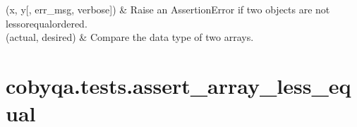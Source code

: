 \documentclass[letterpaper,10pt,english]{sphinxmanual}
\begin{document}
\begin{savenotes}\sphinxatlongtablestart\begin{longtable}[c]{}
\hline

\endfirsthead

%
{}\\
\hline

\endhead

\hline
{}\\
\endfoot

\endlastfoot

\sphinxAtStartPar
{\hyperref[\detokenize{refs/generated/cobyqa.tests.assert_array_less_equal:cobyqa.tests.assert_array_less_equal}]{}}(x, y{[}, err\_msg, verbose{]})
&
\sphinxAtStartPar
Raise an AssertionError if two objects are not less\sphinxhyphen{}or\sphinxhyphen{}equal\sphinxhyphen{}ordered.
\\
\hline
\sphinxAtStartPar
{\hyperref[\detokenize{refs/generated/cobyqa.tests.assert_dtype_equal:cobyqa.tests.assert_dtype_equal}]{}}(actual, desired)
&
\sphinxAtStartPar
Compare the data type of two arrays.
\\
\hline
\end{longtable}\sphinxatlongtableend\end{savenotes}


\section{cobyqa.tests.assert\_array\_less\_equal}
\label{\detokenize{refs/generated/cobyqa.tests.assert_array_less_equal:cobyqa-tests-assert-array-less-equal}}\label{\detokenize{refs/generated/cobyqa.tests.assert_array_less_equal::doc}}
\end{document}
